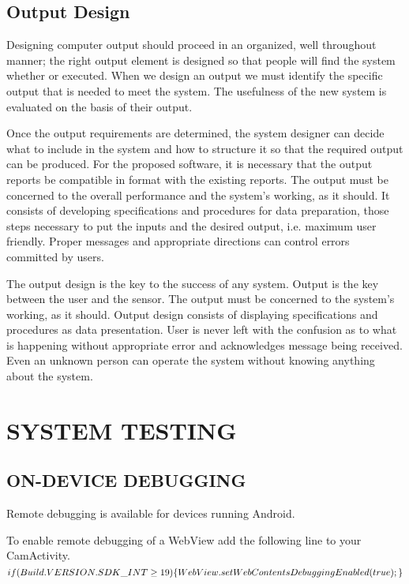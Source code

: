\documentclass{article}
\begin{document}
\subsection{ Output Design }
\par Designing computer output should proceed in an organized, well throughout manner; the right output element is designed so that people will find the system whether or executed. When we design an output we must identify the specific output that is needed to meet the system. The usefulness of the new system is evaluated on the basis of their output. 
\par Once the output requirements are determined, the system designer can decide what to include in the system and how to structure it so that the required output can be produced. For the proposed software, it is necessary that the output reports be compatible in format with the existing reports. The output must be concerned to the overall performance and the system’s working, as it should. It consists of developing specifications and procedures for data preparation, those steps necessary to put the inputs and the desired output, i.e. maximum user friendly. Proper messages and appropriate directions can control errors committed by users.
\par The output design is the key to the success of any system. Output is the key between the user and the sensor. The output must be concerned to the system’s working, as it should. Output design consists of displaying specifications and procedures as data presentation. User is never left with the confusion as to what is happening without appropriate error and acknowledges message being received. Even an unknown person can operate the system without knowing anything about the system. 



\newpage
\section{SYSTEM TESTING }
\subsection{ \textbf{ON-DEVICE DEBUGGING }}
\par Remote debugging is available for devices running Android.
\par{ To enable remote debugging of a WebView add the following line to your CamActivity. }\\[.3cm]
$if(Build.VERSION.SDK\_INT \geq 19) \{\\
WebView.setWebContentsDebuggingEnabled(true);\\
\} $
\end{document}
